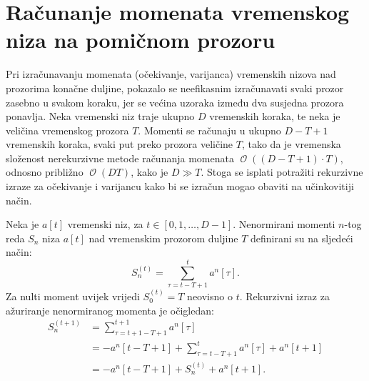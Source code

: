 \documentclass[lmodern, utf8, diplomski, numeric]{fer}
\newcommand{\bigO}[1]{\operatorname{\mathcal{O}}\q(#1\w)}
\newcommand{\q}{\left}
\newcommand{\w}{\right}
\begin{document}
  
  

  \appendix
  \chapter{Računanje momenata vremenskog niza na pomičnom prozoru}
  Pri izračunavanju momenata (očekivanje, varijanca) vremenskih nizova nad prozorima konačne duljine, pokazalo se neefikasnim izračunavati svaki prozor zasebno u svakom koraku, jer se većina uzoraka između dva susjedna prozora ponavlja.
  Neka vremenski niz traje ukupno $D$ vremenskih koraka, te neka je veličina vremenskog prozora $T$.
  Momenti se računaju u ukupno $D - T + 1$ vremenskih koraka, svaki put preko prozora veličine $T$, tako da je vremenska složenost nerekurzivne metode računanja momenata $\bigO{\q(D - T + 1\w)\cdot T}$, odnosno približno $\bigO{DT}$, kako je $D \gg T$.
  Stoga se isplati potražiti rekurzivne izraze za očekivanje i varijancu kako bi se izračun mogao obaviti na učinkovitiji način.
  
  Neka je $a\q[t\w]$ vremenski niz, za $t \in \q[0, 1, \ldots, D - 1\w]$.
  Nenormirani momenti $n$-tog reda $S_n$ niza $a\q[t\w]$ nad vremenskim prozorom duljine $T$ definirani su na sljedeći način:
  \begin{equation}
  \label{eq:nonnorm}
  S_n^{(t)} = \sum_{\tau=t-T+1}^{t} a^n\q[\tau\w].
  \end{equation}
  Za nulti moment uvijek vrijedi $S_0^{(t)} = T$ neovisno o $t$.
  Rekurzivni izraz za ažuriranje nenormiranog momenta je očigledan:
  \begin{align}
  S_n^{(t+1)} &= \sum_{\tau=t+1-T+1}^{t+1} a^n\q[\tau\w] \nonumber \\
    &= -a^n\q[t-T+1\w] + \sum_{\tau=t-T+1}^{t} a^n\q[\tau\w] + a^n\q[t+1\w] \nonumber \\
    \label{eq:rec}
    &= -a^n\q[t-T+1\w] + S_n^{(t)} + a^n\q[t+1\w].
  \end{align}
  
\end{document}
